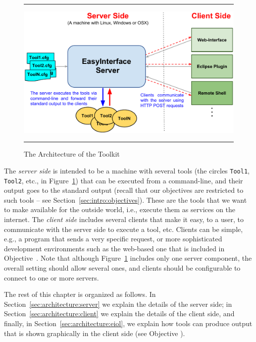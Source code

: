 \begin{figure}[t]
\hrule\smallskip
\begin{center}
\includegraphics[width=1\textwidth]{fig/ei.pdf}
\end{center}
\caption{The Architecture of the \ei Toolkit}
\label{fig:eiarch}
\hrule
\end{figure}

%
The \emph{server side} is intended to be a machine with several tools
(the circles \texttt{Tool1}, \texttt{Tool2}, etc., in
Figure~\ref{fig:eiarch}) that can be executed from a command-line, and
their output goes to the standard output (recall that our objectives
are restricted to such tools -- see
Section~\ref{sec:intro:objectives}). These are the tools that we want
to make available for the outside world, i.e., execute them as
services on the internet.
%
The \emph{client side} includes several clients that make it easy, to
a user, to communicate with the server side to execute a tool,
etc. Clients can be simple, e.g., a program that sends a very specific
request, or more sophisticated development environments such as the
web-based one that is included in Objective~.
%
Note that although Figure~\ref{fig:eiarch} includes only one server
component, the overall setting should allow several ones, and clients
should be configurable to connect to one or more servers.

The rest of this chapter is organized as follows. In
Section~\ref{sec:architecture:server} we explain the details of the
server side; in Section~\ref{sec:architecture:client} we explain the
details of the client side, and finally, in
Section~\ref{sec:architecture:eiol}, we explain how tools can produce
output that is shown graphically in the client side (see Objective
).
%

